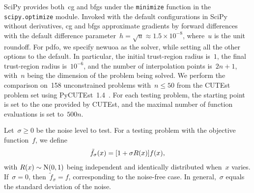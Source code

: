 \documentclass[
    smallextended,  %
    final,          %
]{svjour3}
\newcommand{\NN}{\mathrm{N}}
\newcommand{\iter}[1][k]{x\ifthenelse{\equal{#1}{}}{}{_{#1}}}
\newcommand{\obj}{f}
\begin{document}
SciPy provides both~\gls{cg} and \gls{bfgs} under the \texttt{minimize} function in the \texttt{scipy.optimize} module.
Invoked with the default configurations in SciPy without derivatives,
\gls{cg} and \gls{bfgs} approximate gradients by forward differences with the default difference
parameter~$h = \sqrt{u} \approx 1.5\times 10^{-8}$, where~$u$ is the unit roundoff.
For \gls{pdfo}, we specify \gls{newuoa} as the solver, while setting all the other options to the default.
In particular, the initial trust-region radius is~$1$, the final trust-region radius is~$10^{-6}$,
and the number of interpolation points is~$2n + 1$, with~$n$ being the dimension of the problem
being solved.
We perform the comparison on~158 unconstrained problems with~$n \le 50$ from the
CUTEst~\cite{Gould_Orban_Toint_2015} problem set using PyCUTEst~1.4~\cite{Fowkes_Roberts_Burmen_2022}.
For each testing problem, the starting point is set to the one provided by CUTEst, and the maximal
number of function evaluations is set to~$500n$.




Let~$\sigma \ge 0$ be the noise level to test.
For a testing problem with the objective function~$\obj$, we define
\begin{equation}
    \label{eq:noisy-obj}
    \tilde{\obj}_\sigma(\iter[]) = [1 + \sigma R(\iter[])] \obj(\iter[]),
\end{equation}
with $R(\iter[])\sim \NN(0, 1)$ being independent and identically distributed when~$x$ varies.
If~$\sigma = 0$, then~$\tilde{f}_\sigma = f$, corresponding to the noise-free case.
In general,~$\sigma$ equals the standard deviation of the noise.
\end{document}
